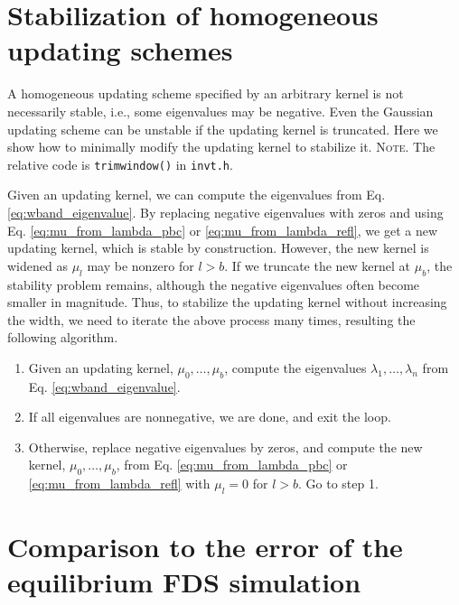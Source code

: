 \documentclass[reprint, floatfix]{revtex4-1}
\newcommand{\note}[1]{{\color{DarkGreen}\footnotesize \textsc{Note.} #1}}
\begin{document}
\section{\label{sec:stabilize_wband}
Stabilization of homogeneous updating schemes}



%
A homogeneous updating scheme
specified by an arbitrary kernel
is not necessarily stable,
i.e., some eigenvalues may be negative.
%
%
  Even
  the Gaussian updating scheme can be unstable
  if the updating kernel is truncated.
%
Here we show how to minimally modify
the updating kernel
to stabilize it.
%
\note{The relative code is \texttt{trimwindow()} in \texttt{invt.h}.
}


Given an updating kernel,
we can compute the eigenvalues from
Eq. \eqref{eq:wband_eigenvalue}.
%
By replacing negative eigenvalues with zeros and
using Eq. \eqref{eq:mu_from_lambda_pbc}
or \eqref{eq:mu_from_lambda_refl},
we get a new updating kernel,
which is stable by construction.
%
However, the new kernel is widened
as $\mu_l$ may be nonzero for $l > b$.
%
If we truncate the new kernel at $\mu_b$,
the stability problem remains,
although the negative eigenvalues
often become smaller in magnitude.
%
Thus, to stabilize the updating kernel
without increasing the width,
we need to iterate the above process many times,
resulting the following algorithm.


%
\begin{enumerate}
  \item
    Given an updating kernel, $\mu_0, \dots, \mu_b$,
    compute the eigenvalues
    $\lambda_1, \dots, \lambda_n$
    from Eq. \eqref{eq:wband_eigenvalue}.
  \item
    If all eigenvalues are nonnegative,
    we are done, and exit the loop.
  \item
    Otherwise, replace negative eigenvalues by zeros,
    and compute the new kernel,
    $\mu_0, \dots, \mu_b$, from
    Eq. \eqref{eq:mu_from_lambda_pbc}
    or
    \eqref{eq:mu_from_lambda_refl}
    with $\mu_l = 0$ for $l > b$.
    Go to step 1.
\end{enumerate}



\section{\label{sec:equilerr}
Comparison to the error of the equilibrium FDS simulation}
\end{document}
